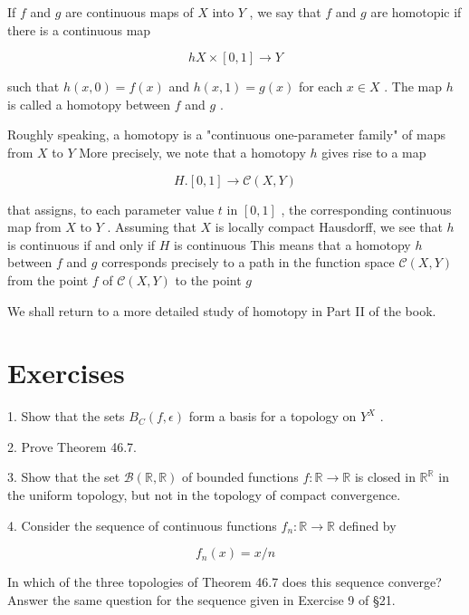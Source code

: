 If \(f\) and \(g\) are continuous maps of \(X\) into \(Y\) , we say that \(f\) and \(g\) are homotopic if there is a continuous map

\[
{hX} \times  \left\lbrack  {0,1}\right\rbrack   \rightarrow  Y
\]

such that \(h\left( {x,0}\right)  = f\left( x\right)\) and \(h\left( {x,1}\right)  = g\left( x\right)\) for each \(x \in  X\) . The map \(h\) is called a homotopy between \(f\) and \(g\) .

Roughly speaking, a homotopy is a "continuous one-parameter family" of maps from \(X\) to \(Y\) More precisely, we note that a homotopy \(h\) gives rise to a map

\[
H.\left\lbrack  {0,1}\right\rbrack   \rightarrow  \mathcal{C}\left( {X,Y}\right)
\]

that assigns, to each parameter value \(t\) in \(\left\lbrack  {0,1}\right\rbrack\) , the corresponding continuous map from \(X\) to \(Y\) . Assuming that \(X\) is locally compact Hausdorff, we see that \(h\) is continuous if and only if \(H\) is continuous This means that a homotopy \(h\) between \(f\) and \(g\) corresponds precisely to a path in the function space \(\mathcal{C}\left( {X,Y}\right)\) from the point \(f\) of \(\mathcal{C}\left( {X,Y}\right)\) to the point \(g\)

We shall return to a more detailed study of homotopy in Part II of the book.

\section*{Exercises}

1. Show that the sets \({B}_{C}\left( {f,\epsilon }\right)\) form a basis for a topology on \({Y}^{X}\) .

2. Prove Theorem 46.7.

3. Show that the set \(\mathcal{B}\left( {\mathbb{R},\mathbb{R}}\right)\) of bounded functions \(f : \mathbb{R} \rightarrow  \mathbb{R}\) is closed in \({\mathbb{R}}^{\mathbb{R}}\) in the uniform topology, but not in the topology of compact convergence.

4. Consider the sequence of continuous functions \({f}_{n} : \mathbb{R} \rightarrow  \mathbb{R}\) defined by

\[
{f}_{n}\left( x\right)  = x/n
\]

In which of the three topologies of Theorem 46.7 does this sequence converge? Answer the same question for the sequence given in Exercise 9 of §21.

